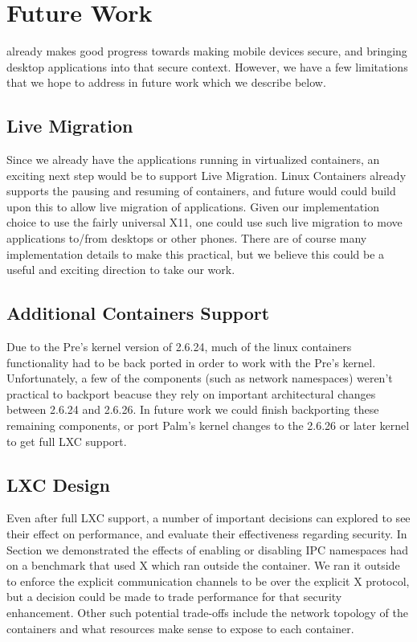 \section{Future Work}
    \emph{\proj} already makes good progress towards making mobile devices secure, and bringing desktop applications into that secure context.  However, we have a few limitations that we hope to address in future work which we describe below.
\subsection{Live Migration}
Since we already have the applications running in virtualized containers, an exciting next step would be to support Live Migration.  Linux Containers already supports the pausing and resuming of containers, and future would could build upon this to allow live migration of applications.  Given our implementation choice to use the fairly universal X11, one could use such live migration to move applications to/from desktops or other phones.  There are of course many implementation details to make this practical, but we believe this could be a useful and exciting direction to take our work.

\subsection{Additional Containers Support}
Due to the Pre's kernel version of 2.6.24, much of the linux containers functionality had to be back ported in order to work with the Pre's kernel.  Unfortunately, a few of the components (such as network namespaces) weren't practical to backport beacuse they rely on important architectural changes between 2.6.24 and 2.6.26.  In future work we could finish backporting these remaining components, or port Palm's kernel changes to the 2.6.26 or later kernel to get full LXC support.

\subsection{LXC Design}
Even after full LXC support, a number of important decisions can explored to see their effect on performance, and evaluate their effectiveness regarding security.  In Section  we demonstrated the effects of enabling or disabling IPC namespaces had on a benchmark that used X which ran outside the container.  We ran it outside to enforce the explicit communication channels to be over the explicit X protocol, but a decision could be made to trade performance for that security enhancement.  Other such potential trade-offs include the network topology of the containers and what resources make sense to expose to each container.
